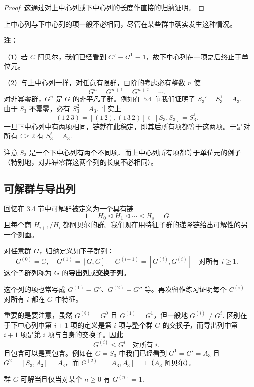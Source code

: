 \begin{proof}
这通过对上中心列或下中心列的长度作直接的归纳证明。
\end{proof}

上中心列与下中心列的项一般不必相同，尽管在某些群中确实发生这种情况。

\textbf{注：}

（1）若 \(G\) 阿贝尔，我们已经看到 \(G' = G^1 = 1\)，故下中心列在一项之后终止于单位元。

（2）与上中心列一样，对任意有限群，由阶的考虑必有整数 \(n\) 使
\[
G^n = G^{n+1} = G^{n+2} = \cdots .
\]
对非幂零群，\(G^n\) 是 \(G\) 的非平凡子群。例如在 5.4 节我们证明了 \(S_3' = S_3^1 = A_3\). 由于 \(S_3\) 不幂零，必有 \(S_3^2 = A_3\). 事实上
\[
(1\,2\,3) = [(1\,2), (1\,3\,2)] \in [S_3, S_3] = S_3^1.
\]
一旦下中心列中有两项相同，链就在此稳定，即其后所有项都等于这两项。于是对所有 \(i \geq 2\) 有 \(S_3^i = A_3\).

注意 \(S_3\) 是一个下中心列有两个不同项、而上中心列所有项都等于单位元的例子（特别地，对非幂零群这两个列的长度不必相同）。

\subsection*{可解群与导出列}

回忆在 3.4 节中可解群被定义为一个具有链
\[
1 = H_0 \trianglelefteq H_1 \trianglelefteq \cdots \trianglelefteq H_s = G
\]
且每个商 \(H_{i+1}/H_i\) 都阿贝尔的群。我们现在用特征子群的递降链给出可解性的另一个刻画。

\begin{definition}
对任意群 \(G\)，归纳定义如下子群列：
\[
G^{(0)} = G,\quad G^{(1)} = [G, G],\quad G^{(i+1)} = [G^{(i)}, G^{(i)}] \quad \text{对所有 } i \geq 1.
\]
这个子群列称为 \(G\) 的\textbf{导出列}或\textbf{交换子列}。
\end{definition}

这个列的项也常写成 \(G^{(1)} = G'\)、\(G^{(2)} = G''\) 等。再次留作练习证明每个 \(G^{(i)}\) 对所有 \(i\) 都在 \(G\) 中特征。

重要的是要注意，虽然 \(G^{(0)} = G^0\) 且 \(G^{(1)} = G^1\)，但一般地 \(G^{(i)} \neq G^i\). 区别在于下中心列中第 \(i+1\) 项的定义是第 \(i\) 项与整个群 \(G\) 的交换子，而导出列中第 \(i+1\) 项是第 \(i\) 项与自身的交换子。因此
\[
G^{(i)} \leq G^i \quad \text{对所有 } i,
\]
且包含可以是真包含。例如在 \(G = S_3\) 中我们已经看到 \(G^1 = G' = A_3\) 且 \(G^2 = [S_3, A_3] = A_3\)，而 \(G^{(2)} = [A_3, A_3] = 1\)（\(A_3\) 阿贝尔）。

\begin{theorem}\label{thm:6.9}
群 \(G\) 可解当且仅当对某个 \(n \geq 0\) 有 \(G^{(n)} = 1\).
\end{theorem}

